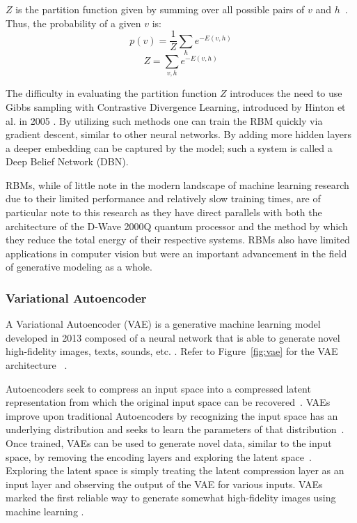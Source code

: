 \documentclass[technologies,article,accept,pdftex,moreauthors]{Definitions/mdpi}
\newcommand{\figref}[1]{Figure~\ref{#1}}
\begin{document}
$Z$ is the partition function given by summing over all possible pairs of $v$ and $h$~\cite{Hinton2012}. Thus, the probability of a given $v$ is: 
\begin{equation}
p(v) = \frac{1}{Z}\sum_{h} e^{-E(v,h)}
\end{equation} 
\begin{equation}
Z = \sum_{v,h}e^{-E(v,h)}
\end{equation}



The difficulty in evaluating the partition function $Z$ introduces the need to use Gibbs sampling with Contrastive Divergence Learning, introduced by Hinton et al. in 2005 \cite{CarreiraPerpin2005OnCD}. By utilizing such methods one can train the RBM quickly via gradient descent, similar to other neural networks. By adding more hidden layers a deeper embedding can be captured by the model; such a system is called a Deep Belief Network (DBN).


RBMs, while of little note in the modern landscape of machine learning research due to their limited performance and relatively slow training times, are of particular note to this research as they have direct parallels with both the architecture of the D-Wave 2000Q quantum processor and the method by which they reduce the total energy of their respective systems. RBMs also have limited applications in computer vision but were an important advancement in the field of generative modeling as a whole.



\subsubsection{Variational Autoencoder}
A Variational Autoencoder (VAE) is a generative machine learning model developed in 2013 composed of a neural network that is able to generate novel high-fidelity images, texts, sounds, etc. \cite{kingma2014autoencoding}. Refer to \figref{fig:vae} for the VAE architecture ~\cite{rocca_2021}.


Autoencoders seek to compress an input space into a compressed latent representation from which the original input space can be recovered~\cite{kingma2014autoencoding}. VAEs improve upon traditional Autoencoders by recognizing the input space has an underlying distribution and seeks to learn the parameters of that distribution~\cite{kingma2014autoencoding}. Once trained, VAEs can be used to generate novel data, similar to the input space, by removing the encoding layers and exploring the latent space~\cite{kingma2014autoencoding}. Exploring the latent space is simply treating the latent compression layer as an input layer and observing the output of the VAE for various inputs. VAEs marked the first reliable way to generate somewhat high-fidelity images using machine learning \cite{rocca_2021}.
\end{document}
